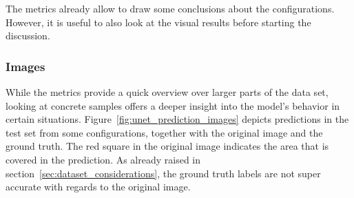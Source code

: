 The metrics already allow to draw some conclusions about the configurations. However, it is useful to also look at the visual results before starting the discussion.

\subsubsection{Images}
While the metrics provide a quick overview over larger parts of the data set, looking at concrete samples offers a deeper insight into the model's behavior in certain situations. Figure~\ref{fig:unet_prediction_images} depicts predictions in the test set from some configurations, together with the original image and the ground truth. The red square in the original image indicates the area that is covered in the prediction. As already raised in section~\ref{sec:dataset_considerations}, the ground truth labels are not super accurate with regards to the original image.

